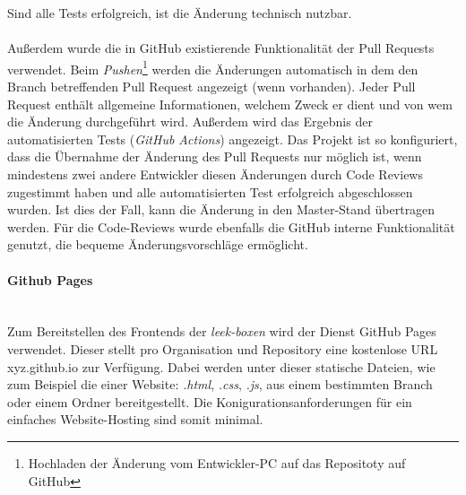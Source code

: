 \documentclass[10pt, a4paper]{article}
\begin{document}
\begin{onehalfspace}
\begin{enumerate}
      \end{enumerate}
      Sind alle Tests erfolgreich, ist die Änderung technisch nutzbar.
      \\~\\
      Außerdem wurde die in GitHub existierende Funktionalität der Pull Requests verwendet. Beim \textit{Pushen}\footnote{Hochladen der Änderung vom Entwickler-PC auf das Repositoty auf GitHub}
      werden die Änderungen automatisch in dem den Branch betreffenden Pull Request angezeigt (wenn vorhanden).
      Jeder Pull Request enthält allgemeine Informationen, welchem Zweck er dient und von wem die Änderung durchgeführt wird. Außerdem wird das Ergebnis der automatisierten Tests (\textit{GitHub Actions}) angezeigt.
      Das Projekt ist so konfiguriert, dass die Übernahme der Änderung des Pull Requests nur möglich ist, wenn mindestens zwei andere Entwickler diesen Änderungen
      durch Code Reviews zugestimmt haben und alle automatisierten Test erfolgreich abgeschlossen wurden. Ist dies der Fall, kann die Änderung in den Master-Stand übertragen werden.
      Für die Code-Reviews wurde ebenfalls die GitHub interne Funktionalität genutzt, die bequeme Änderungsvorschläge ermöglicht.

      \paragraph{Github Pages} $~$ \\
      Zum Bereitstellen des Frontends der \textit{leek-boxen} wird der Dienst GitHub Pages verwendet. Dieser stellt pro Organisation und Repository eine kostenlose URL xyz.github.io zur Verfügung.
      Dabei werden unter dieser statische Dateien, wie zum Beispiel die einer Website: \textit{.html}, \textit{.css}, \textit{.js}, aus einem bestimmten Branch oder einem Ordner bereitgestellt.
      Die Konigurationsanforderungen für ein einfaches Website-Hosting sind somit minimal.


\end{onehalfspace}
\end{document}
